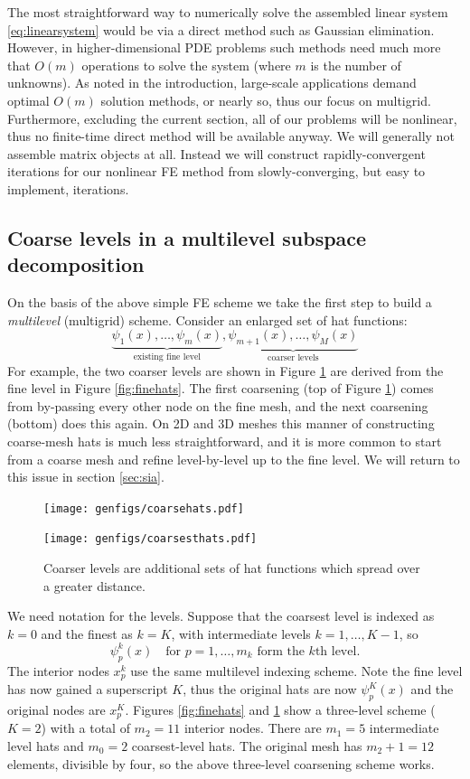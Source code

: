 \documentclass[letterpaper,final,12pt,reqno]{amsart}
\numberwithin{equation}{section}
\numberwithin{figure}{section}
\numberwithin{table}{section}
\begin{document}
The most straightforward way to numerically solve the assembled linear system \eqref{eq:linearsystem} would be via a direct method such as Gaussian elimination.  However, in higher-dimensional PDE problems such methods need much more that $O(m)$ operations to solve the system (where $m$ is the number of unknowns).  As noted in the introduction, large-scale applications demand optimal $O(m)$ solution methods, or nearly so, thus our focus on multigrid.  Furthermore, excluding the current section, all of our problems will be nonlinear, thus no finite-time direct method will be available anyway.  We will generally not assemble matrix objects at all.  Instead we will construct rapidly-convergent iterations for our nonlinear FE method from slowly-converging, but easy to implement, iterations.

\subsection*{Coarse levels in a multilevel subspace decomposition}  On the basis of the above simple FE scheme we take the first step to build a \emph{multilevel} (multigrid) scheme.  Consider an enlarged set of hat functions:
    $$\underbrace{\psi_1(x),\dots,\psi_m(x)}_{\text{existing fine level}},\underbrace{\psi_{m+1}(x),\dots,\psi_M(x)}_{\text{coarser levels}}$$
For example, the two coarser levels are shown in Figure \ref{fig:coarsehats} are derived from the fine level in Figure \ref{fig:finehats}.  The first coarsening (top of Figure \ref{fig:coarsehats}) comes from by-passing every other node on the fine mesh, and the next coarsening (bottom) does this again.  On 2D and 3D meshes this manner of constructing coarse-mesh hats is much less straightforward, and it is more common to start from a coarse mesh and refine level-by-level up to the fine level.  We will return to this issue in section \ref{sec:sia}.

\begin{figure}
\texttt{[image: genfigs/coarsehats.pdf]}
\smallskip

\texttt{[image: genfigs/coarsesthats.pdf]}
\caption{Coarser levels are additional sets of hat functions which spread over a greater distance.}
\label{fig:coarsehats}
\end{figure}

We need notation for the levels.  Suppose that the coarsest level is indexed as $k=0$ and the finest as $k=K$, with intermediate levels $k=1,\dots,K-1$, so
\begin{equation}
  \psi_p^k(x) \quad \text{for } p=1,\dots,m_k \text{ form the $k$th level}.  \label{eq:definepsijk}
\end{equation}
The interior nodes $x_p^k$ use the same multilevel indexing scheme.  Note the fine level has now gained a superscript $K$, thus the original hats are now $\psi_p^K(x)$ and the original nodes are $x_p^K$.  Figures \ref{fig:finehats} and \ref{fig:coarsehats} show a three-level scheme ($K=2$) with a total of $m_2=11$ interior nodes.  There are $m_1=5$ intermediate level hats and $m_0=2$ coarsest-level hats.  The original mesh has $m_2+1=12$ elements, divisible by four, so the above three-level coarsening scheme works.
\end{document}
